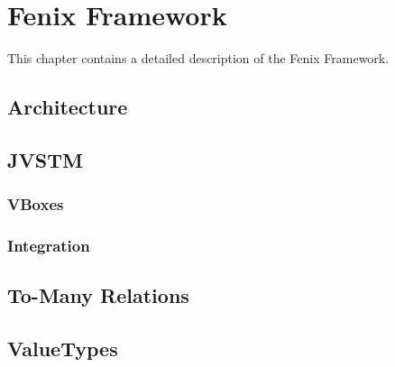 \chapter{Fenix Framework}
\label{chap:ff}

This chapter contains a detailed description of the Fenix Framework.

\section{Architecture}

\section{JVSTM}

\subsection{VBoxes}

\subsection{Integration}

\section{To-Many Relations}

\section{ValueTypes}

